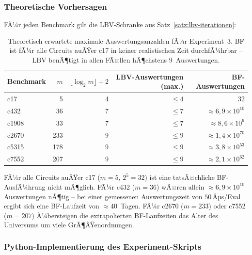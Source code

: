 ﻿\documentclass[a4paper,12pt]{article}
\theoremstyle{definition}
\begin{document}
\subsubsection{Theoretische Vorhersagen}

FÃ¼r jeden Benchmark gilt die LBV-Schranke aus
Satz~\ref{satz:lbv-iterationen}:

\begin{table}[h]
  \centering
  \begin{tabular}{lrrrr}
    \toprule
    \textbf{Benchmark} & $m$ & $\lfloor\log_2 m\rfloor+2$
      & \textbf{LBV-Auswertungen (max.)} & \textbf{BF-Auswertungen} \\
    \midrule
    c17   &   5 & 4 & $\leq 4$ &                        32 \\
    c432  &  36 & 7 & $\leq 7$ & ${\approx}6{,}9 \times 10^{10}$ \\
    c1908 &  33 & 7 & $\leq 7$ & ${\approx}8{,}6 \times 10^{9}$ \\
    c2670 & 233 & 9 & $\leq 9$ & ${\approx}1{,}4 \times 10^{70}$ \\
    c5315 & 178 & 9 & $\leq 9$ & ${\approx}3{,}8 \times 10^{53}$ \\
    c7552 & 207 & 9 & $\leq 9$ & ${\approx}2{,}1 \times 10^{62}$ \\
    \bottomrule
  \end{tabular}
  \caption{Theoretisch erwartete maximale Auswertungsanzahlen fÃ¼r Experiment~3.
           BF ist fÃ¼r alle Circuits auÃŸer c17 in keiner realistischen Zeit
           durchfÃ¼hrbar -- LBV benÃ¶tigt in allen FÃ¤llen hÃ¶chstens 9~Auswertungen.}
  \label{tab:exp3-theorie}
\end{table}

FÃ¼r alle Circuits auÃŸer c17 ($m=5$, $2^5 = 32$) ist eine tatsÃ¤chliche
BF-AusfÃ¼hrung nicht mÃ¶glich.  FÃ¼r c432 ($m=36$) wÃ¤ren allein
${\approx}6{,}9 \times 10^{10}$ Auswertungen nÃ¶tig -- bei einer gemessenen
Auswertungszeit von $50$\,Âµs/Eval ergibt sich eine BF-Laufzeit von
${\approx}40$~Tagen.  FÃ¼r c2670 ($m=233$) oder c7552 ($m=207$) Ã¼bersteigen
die extrapolierten BF-Laufzeiten das Alter des Universums um viele
GrÃ¶ÃŸenordnungen.

\subsubsection{Python-Implementierung des Experiment-Skripts}
\end{document}
